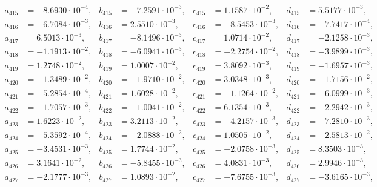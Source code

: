 \begin{align*}
  a_{ 415 } &= -8.6930 \cdot 10^{ -4 }, & b_{ 415 } &= -7.2591 \cdot 10^{ -3 }, & c_{ 415 } &= 1.1587 \cdot 10^{ -2 }, & d_{ 415 } &= 5.5177 \cdot 10^{ -3 }, \\ 
  a_{ 416 } &= -6.7084 \cdot 10^{ -3 }, & b_{ 416 } &= 2.5510 \cdot 10^{ -3 }, & c_{ 416 } &= -8.5453 \cdot 10^{ -3 }, & d_{ 416 } &= -7.7417 \cdot 10^{ -4 }, \\ 
  a_{ 417 } &= 6.5013 \cdot 10^{ -3 }, & b_{ 417 } &= -8.1496 \cdot 10^{ -3 }, & c_{ 417 } &= 1.0714 \cdot 10^{ -2 }, & d_{ 417 } &= -2.1258 \cdot 10^{ -3 }, \\ 
  a_{ 418 } &= -1.1913 \cdot 10^{ -2 }, & b_{ 418 } &= -6.0941 \cdot 10^{ -3 }, & c_{ 418 } &= -2.2754 \cdot 10^{ -2 }, & d_{ 418 } &= -3.9899 \cdot 10^{ -3 }, \\ 
  a_{ 419 } &= 1.2748 \cdot 10^{ -2 }, & b_{ 419 } &= 1.0007 \cdot 10^{ -2 }, & c_{ 419 } &= 3.8092 \cdot 10^{ -3 }, & d_{ 419 } &= -1.6957 \cdot 10^{ -3 }, \\ 
  a_{ 420 } &= -1.3489 \cdot 10^{ -2 }, & b_{ 420 } &= -1.9710 \cdot 10^{ -2 }, & c_{ 420 } &= 3.0348 \cdot 10^{ -3 }, & d_{ 420 } &= -1.7156 \cdot 10^{ -2 }, \\ 
  a_{ 421 } &= -5.2854 \cdot 10^{ -4 }, & b_{ 421 } &= 1.6028 \cdot 10^{ -2 }, & c_{ 421 } &= -1.1264 \cdot 10^{ -2 }, & d_{ 421 } &= -6.0999 \cdot 10^{ -3 }, \\ 
  a_{ 422 } &= -1.7057 \cdot 10^{ -3 }, & b_{ 422 } &= -1.0041 \cdot 10^{ -2 }, & c_{ 422 } &= 6.1354 \cdot 10^{ -3 }, & d_{ 422 } &= -2.2942 \cdot 10^{ -3 }, \\ 
  a_{ 423 } &= 1.6223 \cdot 10^{ -2 }, & b_{ 423 } &= 3.2113 \cdot 10^{ -2 }, & c_{ 423 } &= -4.2157 \cdot 10^{ -3 }, & d_{ 423 } &= -7.2810 \cdot 10^{ -3 }, \\ 
  a_{ 424 } &= -5.3592 \cdot 10^{ -4 }, & b_{ 424 } &= -2.0888 \cdot 10^{ -2 }, & c_{ 424 } &= 1.0505 \cdot 10^{ -2 }, & d_{ 424 } &= -2.5813 \cdot 10^{ -2 }, \\ 
  a_{ 425 } &= -3.4531 \cdot 10^{ -3 }, & b_{ 425 } &= 1.7744 \cdot 10^{ -2 }, & c_{ 425 } &= -2.0758 \cdot 10^{ -3 }, & d_{ 425 } &= 8.3503 \cdot 10^{ -3 }, \\ 
  a_{ 426 } &= 3.1641 \cdot 10^{ -2 }, & b_{ 426 } &= -5.8455 \cdot 10^{ -3 }, & c_{ 426 } &= 4.0831 \cdot 10^{ -3 }, & d_{ 426 } &= 2.9946 \cdot 10^{ -3 }, \\ 
  a_{ 427 } &= -2.1777 \cdot 10^{ -3 }, & b_{ 427 } &= 1.0893 \cdot 10^{ -2 }, & c_{ 427 } &= -7.6755 \cdot 10^{ -3 }, & d_{ 427 } &= -3.6165 \cdot 10^{ -3 }, \\ 

\end{align*}
